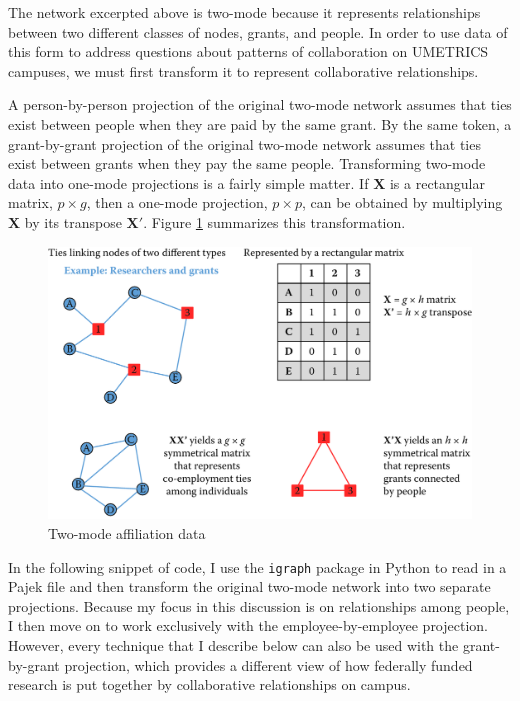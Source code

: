 \documentclass[]{krantz}
\begin{document}
The network excerpted above is two-mode because it represents
relationships between two different classes of nodes, grants, and
people. In order to use data of this form to address questions about
patterns of collaboration on UMETRICS campuses, we must first transform
it to represent collaborative relationships.

A person-by-person projection of the original two-mode network assumes
that ties exist between people when they are paid by the same grant. By
the same token, a grant-by-grant projection of the original two-mode
network assumes that ties exist between grants when they pay the same
people. Transforming two-mode data into one-mode projections is a fairly
simple matter. If \(\mathbf{X}\) is a rectangular matrix,
\(p \times g\), then a one-mode projection, \(p \times p\), can be
obtained by multiplying \(\mathbf{X}\) by its transpose \(\mathbf{X}'\).
Figure \ref{fig:fig8-3} summarizes this transformation.

\begin{figure}

{\centering \includegraphics[width=0.7\linewidth]{ChapterNetworks/figures/fig8-3} 

}

\caption{Two-mode affiliation data}\label{fig:fig8-3}
\end{figure}

In the following snippet of code, I use the \texttt{igraph} package in
Python to read in a Pajek file and then transform the original two-mode
network into two separate projections. Because my focus in this
discussion is on relationships among people, I then move on to work
exclusively with the employee-by-employee projection. However, every
technique that I describe below can also be used with the grant-by-grant
projection, which provides a different view of how federally funded
research is put together by collaborative relationships on campus.
\end{document}
